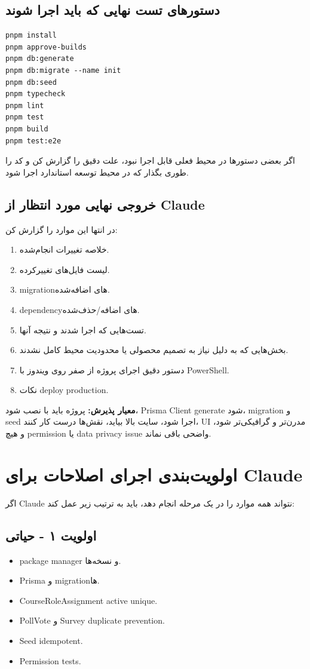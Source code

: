 \documentclass[12pt,a4paper]{article}
\newcommand{\code}[1]{\lr{\texttt{\detokenize{#1}}}}
\begin{document}
\begin{tcolorbox}[title=پرامپت نهایی برای Claude - از اینجا کپی کن]
\subsection*{دستورهای تست نهایی که باید اجرا شوند}
\begin{latin}\begin{lstlisting}
pnpm install
pnpm approve-builds
pnpm db:generate
pnpm db:migrate --name init
pnpm db:seed
pnpm typecheck
pnpm lint
pnpm test
pnpm build
pnpm test:e2e
\end{lstlisting}\end{latin}

اگر بعضی دستورها در محیط فعلی قابل اجرا نبود، علت دقیق را گزارش کن و کد را طوری بگذار که در محیط توسعه استاندارد اجرا شود.

\subsection*{خروجی نهایی مورد انتظار از Claude}
در انتها این موارد را گزارش کن:
\begin{enumerate}
  \item خلاصه تغییرات انجام‌شده.
  \item لیست فایل‌های تغییرکرده.
  \item migrationهای اضافه‌شده.
  \item dependencyهای اضافه/حذف‌شده.
  \item تست‌هایی که اجرا شدند و نتیجه آنها.
  \item بخش‌هایی که به دلیل نیاز به تصمیم محصولی یا محدودیت محیط کامل نشدند.
  \item دستور دقیق اجرای پروژه از صفر روی ویندوز با PowerShell.
  \item نکات deploy production.
\end{enumerate}

\textbf{معیار پذیرش:} پروژه باید با \code{pnpm} نصب شود، Prisma Client generate شود، migration و seed اجرا شود، سایت بالا بیاید، نقش‌ها درست کار کنند، UI مدرن‌تر و گرافیکی‌تر شود، و هیچ permission یا data privacy issue واضحی باقی نماند.
\end{tcolorbox}

\section{اولویت‌بندی اجرای اصلاحات برای Claude}
اگر Claude نتواند همه موارد را در یک مرحله انجام دهد، باید به ترتیب زیر عمل کند:

\subsection{اولویت ۱ - حیاتی}
\begin{itemize}
  \item package manager و نسخه‌ها.
  \item Prisma و migrationها.
  \item CourseRoleAssignment active unique.
  \item PollVote و Survey duplicate prevention.
  \item Seed idempotent.
  \item Permission tests.
\end{itemize}
\end{document}
